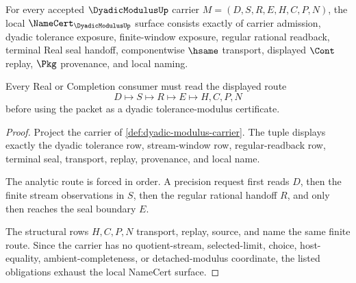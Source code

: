 \begin{theorem}
\label{thm:dyadic-modulus-namecert-obligations}
For every accepted $\DyadicModulusUp$ carrier $M=(D,S,R,E,H,C,P,N)$, the local $\NameCert_{\DyadicModulusUp}$ surface consists exactly of carrier admission, dyadic tolerance exposure, finite-window exposure, regular rational readback, terminal Real seal handoff, componentwise $\hsame$ transport, displayed $\Cont$ replay, $\Pkg$ provenance, and local naming.

Every Real or Completion consumer must read the displayed route
$$
D \longmapsto S \longmapsto R \longmapsto E \longmapsto H,C,P,N
$$
before using the packet as a dyadic tolerance-modulus certificate.
\end{theorem}
\begin{proof}
Project the carrier of \autoref{def:dyadic-modulus-carrier}. The tuple displays exactly the dyadic tolerance row, stream-window row, regular-readback row, terminal seal, transport, replay, provenance, and local name.

The analytic route is forced in order. A precision request first reads $D$, then the finite stream observations in $S$, then the regular rational handoff $R$, and only then reaches the seal boundary $E$.

The structural rows $H,C,P,N$ transport, replay, source, and name the same finite route. Since the carrier has no quotient-stream, selected-limit, choice, host-equality, ambient-completeness, or detached-modulus coordinate, the listed obligations exhaust the local NameCert surface.
\end{proof}

